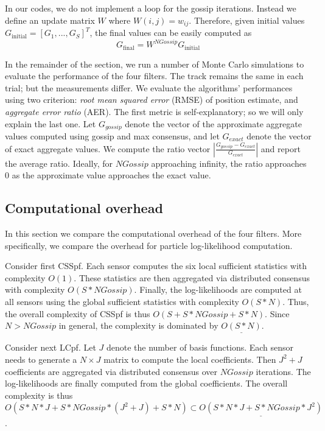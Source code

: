 \documentclass[10pt,letterpaper,final]{article}
\begin{document}
In our codes, we do not implement a loop for the gossip iterations. Instead we define an update matrix $W$ where $W(i,j)=w_{ij}$. Therefore, given initial values $G_{\text{initial}}=[G_1,...,G_S]^T$, the final values can be easily computed as 
\begin{equation}
G_{\text{final}} = W^{NGossip}G_{\text{initial}}
\end{equation}

In the remainder of the section, we run a number of Monte Carlo simulations to evaluate the performance of the four filters. The track remains the same in each trial; but the measurements differ. We evaluate the algorithms' performances using two criterion: \textit{root mean squared error} (RMSE) of position estimate, and \textit{aggregate error ratio} (AER). The first metric is self-explanatory; so we will only explain the last one. Let $G_{gossip}$ denote the vector of the approximate aggregate values computed using gossip and max consensus, and let $G_{exact}$ denote the vector of exact aggregate values. We compute the ratio vector $|\frac{G_{gossip}-G_{exact}}{G_{exact}}|$ and report the average ratio. Ideally, for $NGossip$ approaching infinity, the ratio approaches 0 as the approximate value approaches the exact value. 

\subsection{Computational overhead}
In this section we compare the computational overhead of the four filters. More specifically, we compare the overhead for particle log-likelihood computation.

Consider first CSSpf. Each sensor computes the six local sufficient statistics with complexity $O(1)$. These statistics are then aggregated via distributed consensus with complexity $O(S*NGossip)$. Finally, the log-likelihoods are computed at all sensors using the global sufficient statistics with complexity $O(S*N)$. Thus, the overall complexity of CSSpf is thus $O(S+S*NGossip+S*N)$. Since $N>NGossip$ in general, the complexity is dominated by $\underline{O(S*N)}$. 

Consider next LCpf. Let $J$ denote the number of basis functions. Each sensor needs to generate a $N\times J$ matrix to compute the local coefficients. Then $J^2+J$ coefficients are aggregated via distributed consensus over $NGossip$ iterations. The log-likelihoods are finally computed from the global coefficients. The overall complexity is thus $O(S*N*J+S*NGossip*(J^2+J)+S*N) \subset \underline{O(S*N*J+S*NGossip*J^2)}$. 
\end{document}
